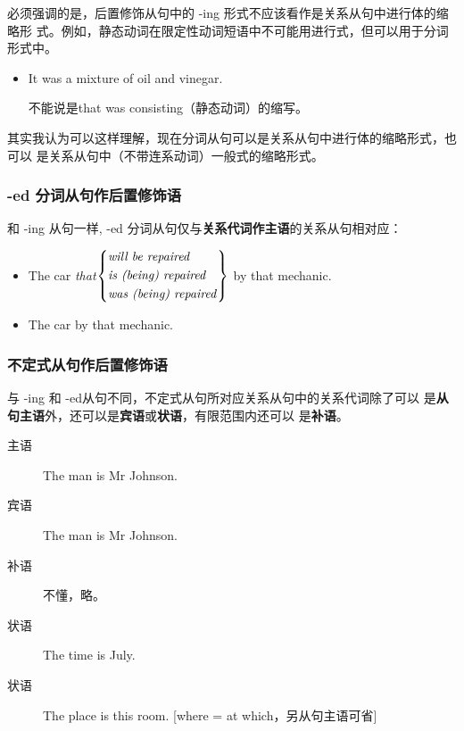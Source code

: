 必须强调的是，后置修饰从句中的 -ing 形式不应该看作是关系从句中进行体的缩略形
式。例如，静态动词在限定性动词短语中不可能用进行式，但可以用于分词形式中。
\begin{itemize}
\item It was a mixture  of oil and vinegar.

  不能说是that was consisting（静态动词）的缩写。
\end{itemize}

其实我认为可以这样理解，现在分词从句可以是关系从句中进行体的缩略形式，也可以
是关系从句中（不带连系动词）一般式的缩略形式。


\subsubsection{ -ed 分词从句作后置修饰语}

和 -ing 从句一样, -ed 分词从句仅与\textbf{关系代词作主语}的关系从句相对应：
\begin{itemize}
\item The car \emph{that}$\left\{
    \begin{aligned}
      &\text{\emph{will be repaired}} \\
      &\text{\emph{is (being) repaired}} \\
      &\text{\emph{was (being) repaired}} \\
    \end{aligned}
  \right\} $ by that mechanic.

\item The car   by that mechanic.
\end{itemize}

\subsubsection{不定式从句作后置修饰语}

与 -ing 和 -ed从句不同，不定式从句所对应关系从句中的关系代词除了可以
是\textbf{从句主语}外，还可以是\textbf{宾语}或\textbf{状语}，有限范围内还可以
是\textbf{补语}。
\begin{description}
\item[主语] The man  is Mr Johnson.

\item[宾语] The man  is Mr Johnson.

\item[补语] 不懂，略。

\item[状语] The time  is July.

\item[状语] The place  is
  this room.  [where = at which，另从句主语可省]
\end{description}

